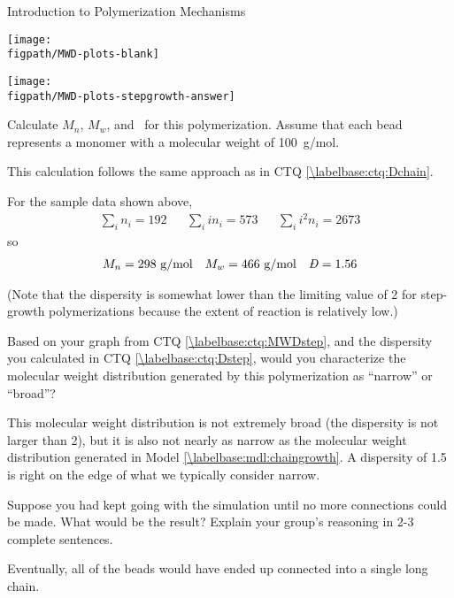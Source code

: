 \begin{activity}{Introduction to Polymerization Mechanisms}
\begin{ctqs}
\begin{solution}[3in]{%
			\centerline{\texttt{[image: \\figpath/MWD-plots-blank]}}
			}
			\centerline{\texttt{[image: \\figpath/MWD-plots-stepgrowth-answer]}}
		\end{solution}
	
	\question Calculate $M_n$, $M_w$, and \PDItext\ for this polymerization.  Assume that each bead represents a monomer with a molecular weight of 100~g/mol. \label{\labelbase:ctq:Dstep}
	
		\begin{solution}[3in]{}
			This calculation follows the same approach as in CTQ \ref{\labelbase:ctq:Dchain}.
			
			For the sample data shown above,
			\begin{align*}
				\sum_i n_i = 192 && \sum_i i n_i = 573 && \sum_i i^2 n_i = 2673
			\end{align*}
			so
			\begin{align*}
				M_n = 298\text{ g/mol} && M_w = 466\text{ g/mol} && \PDImath = 1.56
			\end{align*}
			
			(Note that the dispersity is somewhat lower than the limiting value of 2 for step-growth polymerizations because the extent of reaction is relatively low.)
		\end{solution}
	
	\question Based on your graph from CTQ \ref{\labelbase:ctq:MWDstep}, and the dispersity you calculated in CTQ \ref{\labelbase:ctq:Dstep}, would you characterize the molecular weight distribution generated by this polymerization as ``narrow'' or ``broad''?  %
	
		\begin{solution}[1in]{}
			This molecular weight distribution is not extremely broad (the dispersity is not larger than 2), but it is also not nearly as narrow as the molecular weight distribution generated in Model \ref{\labelbase:mdl:chaingrowth}.  A dispersity of 1.5 is right on the edge of what we typically consider narrow.
		\end{solution}
	
	\question Suppose you had kept going with the simulation until no more  connections could be made.  What would be the result?  Explain your group's reasoning in 2-3 complete sentences.
	
		\begin{solution}[1.75in]{}
			Eventually, all of the beads would have ended up connected into a single long chain.
		\end{solution}
	

\end{ctqs}
\end{activity}

